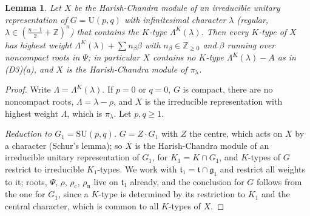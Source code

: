 \documentclass[10pt]{amsart}
\newtheorem{lemma}[theorem]{Lemma}
\theoremstyle{definition}
\theoremstyle{remark}
\newcommand{\Z}{\mathbb Z}
\providecommand{\auU}{\mathrm U}
\begin{document}
\begin{lemma}\label{par:D3}
Let $X$ be the Harish-Chandra module of an irreducible unitary representation of $G=\auU(p,q)$ with infinitesimal character $\lambda$ \textup{(}regular, $\lambda\in(\frac{n-1}2+\Z)^n$\textup{)} that contains the $K$-type $\Lambda^K(\lambda)$. Then every $K$-type of $X$ has highest weight $\Lambda^K(\lambda)+\sum n_\beta\beta$ with $n_\beta\in\Z_{\ge0}$ and $\beta$ running over noncompact roots in $\Psi$; in particular $X$ contains no $K$-type $\Lambda^K(\lambda)-A$ as in \textup{(D3)(a)}, and $X$ is the Harish-Chandra module of $\pi_\lambda$.
\end{lemma}
\begin{proof}
Write $\Lambda=\Lambda^K(\lambda)$. If $p=0$ or $q=0$, $G$ is compact, there are no noncompact roots, $\Lambda=\lambda-\rho$, and $X$ is the irreducible representation with highest weight $\Lambda$, which is $\pi_\lambda$. Let $p,q\ge1$.

\emph{Reduction to $G_1=\mathrm{SU}(p,q)$.} $G=Z\cdot G_1$ with $Z$ the centre, which acts on $X$ by a character (Schur's lemma); so $X$ is the Harish-Chandra module of an irreducible unitary representation of $G_1$, for $K_1=K\cap G_1$, and $K$-types of $G$ restrict to irreducible $K_1$-types. We work with $\mathfrak t_1=\mathfrak t\cap\mathfrak g_1$ and restrict all weights to it; roots, $\Psi$, $\rho$, $\rho_{\mathrm c}$, $\rho_{\mathrm n}$ live on $\mathfrak t_1$ already, and the conclusion for $G$ follows from the one for $G_1$, since a $K$-type is determined by its restriction to $K_1$ and the central character, which is common to all $K$-types of $X$.


\end{proof}
\end{document}
